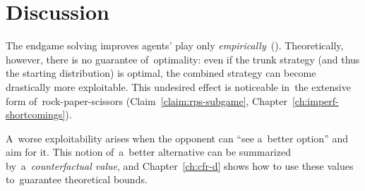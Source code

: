 \todo

\section{Discussion}
The endgame solving improves agents' play only \emph{empirically}~(\cite[Table~1]{GanzfriedSandholm13improving}).
Theoretically, however, there is no guarantee of~optimality:
even if the trunk strategy (and thus the starting distribution) is optimal, the combined strategy can become drastically more exploitable.
This undesired effect is noticeable in~the extensive form of~rock-paper-scissors (Claim~\ref{claim:rps-subgame}, Chapter~\ref{ch:imperf-shortcomings}).

A~worse exploitability arises when the opponent can ``see a~better option'' and aim for it.
This notion of~a~better alternative can be summarized by~a~\emph{counterfactual value}, and Chapter~\ref{ch:cfr-d} shows how to use these values to~guarantee theoretical bounds.
